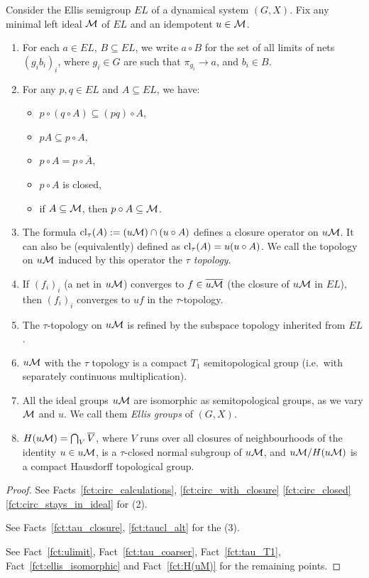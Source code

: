 	\begin{fct}
		\label{fct:tau_top_pre}
		Consider the Ellis semigroup $EL$ of a dynamical system $(G,X)$. Fix any minimal left ideal ${\mathcal M}$ of $EL$ and an idempotent $u\in {\mathcal M}$.
		\begin{enumerate}
			\item
			For each $a\in EL$, $B\subseteq EL$, we write $a\circ B$ for the set of all limits of nets $(g_ib_i)_i$, where $g_i\in G$ are such that $\pi_{g_i}\to a$, and $b_i\in B$.
			\item
			For any $p,q\in EL$ and $A\subseteq EL$, we have:
			\begin{itemize}
				\item
				$p\circ(q\circ A)\subseteq (pq)\circ A$,
				\item
				$pA\subseteq p\circ A$,
				\item
				$p\circ A=p\circ \overline A$,
				\item
				$p\circ A$ is closed,
				\item
				if $A\subseteq {\mathcal M}$, then $p\circ A\subseteq {\mathcal M}$.
			\end{itemize}
			\item
			The formula $\operatorname{{cl}}_\tau(A):=(u{\mathcal M})\cap (u\circ A)$ defines a closure operator on $u{\mathcal M}$. It can also be (equivalently) defined as $\operatorname{{cl}}_\tau(A)=u(u\circ A)$. We call the topology on $u{\mathcal M}$ induced by this operator the {\em $\tau$ topology}.
			\item
			If $(f_i)_i$ (a net in $u{\mathcal M}$) converges to $f\in \overline{u{\mathcal M}}$ (the closure of $u{\mathcal M}$ in $EL$), then $(f_i)_i$ converges to $uf$ in the $\tau$-topology.
			\item
			The $\tau$-topology on $u{\mathcal M}$ is refined by the subspace topology inherited from $EL$.
			\item
			$u{\mathcal M}$ with the $\tau$ topology is a compact $T_1$ semitopological group (i.e.\ with separately continuous multiplication).
			\item
			All the ideal groups $u{\mathcal M}$ are isomorphic as semitopological groups, as we vary ${\mathcal M}$ and $u$. We call them \emph{Ellis groups} of $(G,X)$.
			\item
			$H(u{\mathcal M})=\bigcap_V \overline{V}$, where $V$ runs over all closures of neighbourhoods of the identity $u\in u{\mathcal M}$, is a $\tau$-closed normal subgroup of $u{\mathcal M}$, and $u{\mathcal M}/H(u{\mathcal M})$ is a compact Hausdorff topological group.
		\end{enumerate}
	\end{fct}
	\begin{proof}
		See Facts~\ref{fct:circ_calculations}, \ref{fct:circ_with_closure} \ref{fct:circ_closed} \ref{fct:circ_stays_in_ideal} for (2).
		
		See Facts~\ref{fct:tau_closure}, \ref{fct:taucl_alt} for the (3).
		
		See Fact~\ref{fct:ulimit}, Fact~\ref{fct:tau_coarser}, Fact~\ref{fct:tau_T1}, Fact~\ref{fct:ellis_isomorphic} and Fact~\ref{fct:H(uM)} for the remaining points.
	\end{proof}
	
